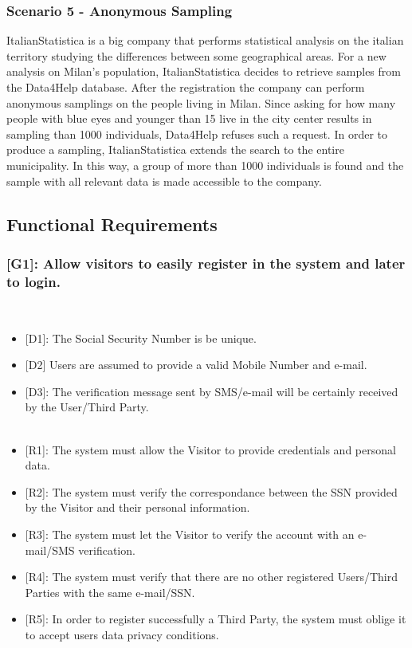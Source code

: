 \documentclass[12pt,a4paper]{article}
\begin{document}
	\subsubsection*{Scenario 5 - Anonymous Sampling}
		ItalianStatistica is a big company that performs statistical analysis on the italian territory studying the differences between some geographical areas. For a new analysis on Milan's population, ItalianStatistica decides to retrieve samples from the Data4Help database. After the registration the company can perform anonymous samplings on the people living in Milan. Since asking for how many people with blue eyes and younger than 15 live in the city center results in sampling than 1000 individuals, Data4Help refuses such a request. In order to produce a sampling, ItalianStatistica extends the search to the entire municipality. In this way, a group of more than 1000 individuals is found and the sample with all relevant data is made accessible to the company.

	\newpage

	\subsection{Functional Requirements}

	\subsubsection*{{[}{G1}{]}: Allow visitors to easily register in the system and later to login.}
	\begin{itemize}\\
		\begin{itemize}
			\item {[D1]}: The Social Security Number is be unique.
			\item {[D2]} Users are assumed to provide a valid Mobile Number and e-mail.
			\item {[D3]}: The verification message sent by SMS/e-mail will be certainly received by the User/Third Party.
			\\\\
			\item {[R1]}: The system must allow the Visitor to provide credentials and personal data.
			\item {[R2]}: The system must verify the correspondance between the SSN provided by the Visitor and their personal information.
			\item {[R3]}: The system must let the Visitor to verify the account with an e-mail/SMS verification.
			\item {[R4]}: The system must verify that there are no other registered Users/Third Parties with the same e-mail/SSN.
			\item {[R5]}: In order to register successfully a Third Party, the system must oblige it to accept users data privacy conditions.
		\end{itemize}
	\end{itemize}
\end{document}
